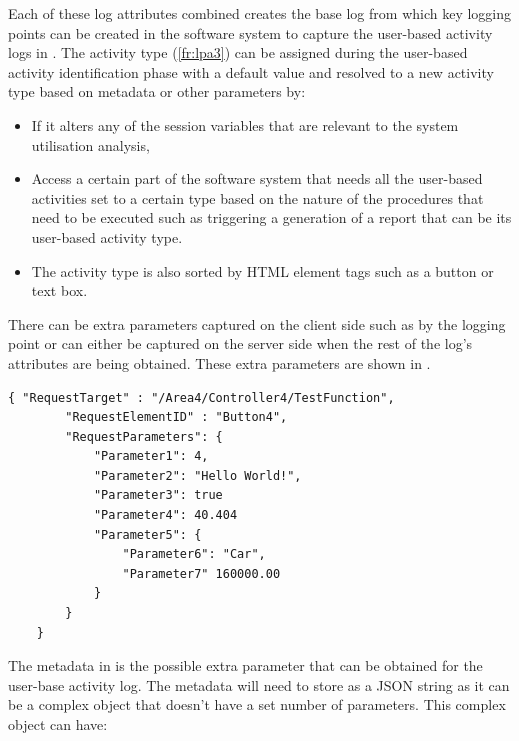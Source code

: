 \clearpage

Each of these log attributes combined creates the base log from which key logging points can be created in the software system to capture the user-based activity logs in . The activity type (\ref{fr:lpa3}) can be assigned during the user-based activity identification phase with a default value and resolved to a new activity type based on metadata or other parameters by:

\begin{itemize}
	\item If it alters any of the session variables that are relevant to the system utilisation analysis,
	\item Access a certain part of the software system that needs all the user-based activities set to a certain type based on the nature of the procedures that need to be executed such as triggering a generation of a report that can be its user-based activity type.
	\item The activity type is also sorted by HTML element tags such as a button or text box.
\end{itemize}

There can be extra parameters captured on the client side such as by the logging point or can either be captured on the server side when the rest of the log's attributes are being obtained. These extra parameters are shown in .

\begin{lstlisting}[style=json, caption={\textit{Metadata JSON}}, label={fig:ch2_MetadataJsonExample}] 
	{ "RequestTarget" : "/Area4/Controller4/TestFunction",
		"RequestElementID" : "Button4",
		"RequestParameters": {
			"Parameter1": 4,
			"Parameter2": "Hello World!",
			"Parameter3": true
			"Parameter4": 40.404
			"Parameter5": {
				"Parameter6": "Car",
				"Parameter7" 160000.00
			}
		}		
	}
\end{lstlisting}

The metadata in  is the possible extra parameter that can be obtained for the user-base activity log. The metadata will need to store as a JSON string as it can be a complex object that doesn't have a set number of parameters. This complex object can have:

